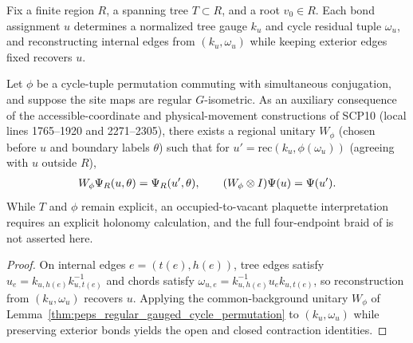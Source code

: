 \begin{lemma}
    \label{thm:peps_actual_cycle_physical_permutation}
    \leanok
    Fix a finite region $R$, a spanning tree $T\subset R$, and a root $v_0\in R$.
    Each bond assignment $u$ determines a normalized tree gauge $k_u$ and cycle residual tuple $\omega_u$, and reconstructing internal edges from $(k_u,\omega_u)$ while keeping exterior edges fixed recovers $u$.

    Let $\phi$ be a cycle-tuple permutation commuting with simultaneous conjugation, and suppose the site maps are regular $G$-isometric.
    As an auxiliary consequence of the accessible-coordinate and physical-movement constructions of SCP10 (local lines 1765--1920 and 2271--2305), there exists a regional unitary $W_\phi$ (chosen before $u$ and boundary labels $\theta$) such that for $u'=\mathrm{rec}(k_u,\phi(\omega_u))$ (agreeing with $u$ outside $R$),
    \begin{align}
        W_\phi\Psi_R(u,\theta)=\Psi_R(u',\theta),\qquad (W_\phi\otimes I)\Psi(u)=\Psi(u'). \notag
    \end{align}
    While $T$ and $\phi$ remain explicit, an occupied-to-vacant plaquette interpretation requires an explicit holonomy calculation, and the full four-endpoint braid of \cite{gap:rmp_peps_quantum_double_g_isometry} is not asserted here.
\end{lemma}
\begin{proof}\leanok
    On internal edges $e=(t(e),h(e))$, tree edges satisfy $u_e=k_{u,h(e)}k_{u,t(e)}^{-1}$ and chords satisfy $\omega_{u,e}=k_{u,h(e)}^{-1}u_e k_{u,t(e)}$, so reconstruction from $(k_u,\omega_u)$ recovers $u$.
    Applying the common-background unitary $W_\phi$ of Lemma~\ref{thm:peps_regular_gauged_cycle_permutation} to $(k_u,\omega_u)$ while preserving exterior bonds yields the open and closed contraction identities.
\end{proof}
